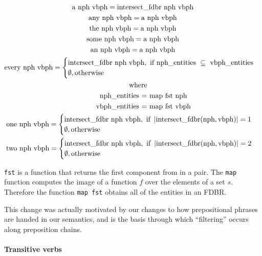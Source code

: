\documentclass[../main.tex]{subfiles}
\begin{document}
\begin{gather*}
\text{a nph vbph} = \text{intersect\_fdbr nph vbph} \\
\text{any nph vbph} = \text{a nph vbph}   \\
\text{the nph vbph} = \text{a nph vbph}  \\
\text{some nph vbph} = \text{a nph vbph}   \\
\text{an nph vbph} = \text{a nph vbph}   \\
\text{every nph vbph} =
\begin{cases}
	\text{intersect\_fdbr nph vbph}, \text{ if nph\_entities } \subseteq \text{ vbph\_entities} \\
	\emptyset, \text{otherwise}
\end{cases} \\
\text{\indent where} \\
\text{\indent\indent nph\_entities = map fst nph} \\
\text{\indent\indent vbph\_entities = map fst vbph} \\
\text{one nph vbph} =
\begin{cases}
	\text{intersect\_fdbr nph vbph}, \text{ if } \left\vert\text{intersect\_fdbr}(\text{nph},\text{vbph})\right\vert = 1 \\
	\emptyset, \text{otherwise}
\end{cases} \\
\text{two nph vbph} =
\begin{cases}
\text{intersect\_fdbr nph vbph}, \text{ if }\left\vert\text{intersect\_fdbr}(\text{nph},\text{vbph})\right\vert = 2 \\
\emptyset, \text{otherwise}
\end{cases}
\end{gather*}

\texttt{fst} is a function that returns the first component from in a pair.  The \texttt{map} function computes the image of a function $f$ over the elements of a set $s$.  
Therefore the function \texttt{map fst} obtains all of the entities in an FDBR.

This change was actually motivated by our changes to how prepositional phrases are handed in our semantics, and is the basis through which
``filtering'' occurs along preposition chains.

\paragraph{Transitive verbs}
\end{document}
